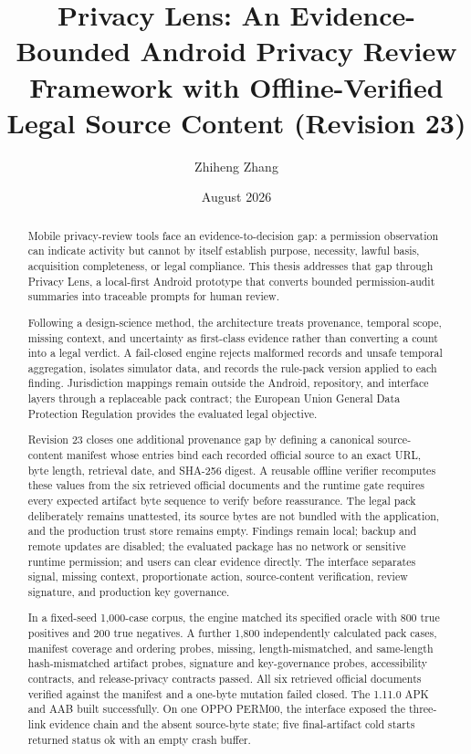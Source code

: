 \documentclass[11pt,a4paper]{article}
\title{Privacy Lens: An Evidence-Bounded Android Privacy Review Framework with Offline-Verified Legal Source Content (Revision 23)}
\author{Zhiheng Zhang}
\date{August 2026}
\begin{document}
\maketitle
\begin{abstract}
\small\singlespacing
Mobile privacy-review tools face an evidence-to-decision gap: a permission observation can indicate activity but cannot by itself establish purpose, necessity, lawful basis, acquisition completeness, or legal compliance. This thesis addresses that gap through Privacy Lens, a local-first Android prototype that converts bounded permission-audit summaries into traceable prompts for human review.

Following a design-science method, the architecture treats provenance, temporal scope, missing context, and uncertainty as first-class evidence rather than converting a count into a legal verdict. A fail-closed engine rejects malformed records and unsafe temporal aggregation, isolates simulator data, and records the rule-pack version applied to each finding. Jurisdiction mappings remain outside the Android, repository, and interface layers through a replaceable pack contract; the European Union General Data Protection Regulation provides the evaluated legal objective.

Revision 23 closes one additional provenance gap by defining a canonical source-content manifest whose entries bind each recorded official source to an exact URL, byte length, retrieval date, and SHA-256 digest. A reusable offline verifier recomputes these values from the six retrieved official documents and the runtime gate requires every expected artifact byte sequence to verify before reassurance. The legal pack deliberately remains unattested, its source bytes are not bundled with the application, and the production trust store remains empty. Findings remain local; backup and remote updates are disabled; the evaluated package has no network or sensitive runtime permission; and users can clear evidence directly. The interface separates signal, missing context, proportionate action, source-content verification, review signature, and production key governance.

In a fixed-seed 1,000-case corpus, the engine matched its specified oracle with 800 true positives and 200 true negatives. A further 1,800 independently calculated pack cases, manifest coverage and ordering probes, missing, length-mismatched, and same-length hash-mismatched artifact probes, signature and key-governance probes, accessibility contracts, and release-privacy contracts passed. All six retrieved official documents verified against the manifest and a one-byte mutation failed closed. The 1.11.0 APK and AAB built successfully. On one OPPO PERM00, the interface exposed the three-link evidence chain and the absent source-byte state; five final-artifact cold starts returned status ok with an empty crash buffer.


\end{abstract}
\end{document}
